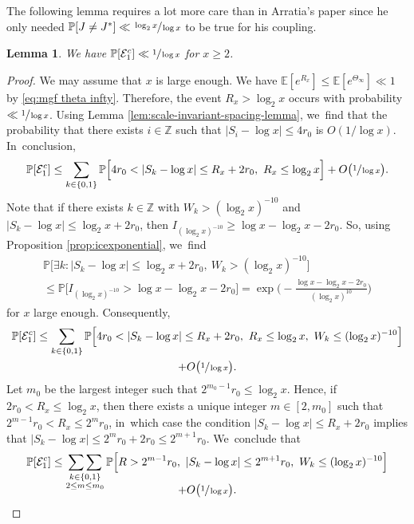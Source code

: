 \documentclass[JEP,XML,SOM,Unicode,published]{cedram}
\newcommand{\ZZ}{\mathbb{Z}}
\newcommand{\PP}{\mathbb{P}}
\newcommand{\EE}{\mathbb{E}}
\newcommand{\EC}{\mathcal{E}}
\newcommand{\bg}{\big}
\newcommand{\bgg}{\Big}
\theoremstyle{plain}
\newtheorem{lem}[cor]{Lemma}
\theoremstyle{definition}
\begin{document}
The following lemma requires a lot more care than in Arratia's paper \cite{Arratia02} since he only needed $\PP[J \ne J^*] \ll \sfrac{\log_2 x}{\log x}$ to be true for his coupling.

\begin{lem}
\label{lem:prob e1c}
We have $\PP[\EC_1^c] \ll \sfrac{1}{\log x}$ for $x\ge2$.
\end{lem}

\begin{proof} We may assume that $x$ is large enough.
We have $\EE[e^{R_x}]\le \EE[e^{\Theta_\infty}] \ll 1$ by \eqref{eq:mgf theta infty}. Therefore, the event $R_x > \log_2 x$ occurs with probability $\ll\sfrac{1}{\log x}$. Using Lemma \ref{lem:scale-invariant-spacing-lemma}, we~find that the probability that there exists $i\in\ZZ$ such that $|S_i-\log x|\le 4r_0$ is $O(1/\log x)$. In~conclusion,
\[
\PP[\EC_1^c] \le \sum_{k\in\{0,1\}} \PP\bgg[4r_0<|S_k-\log x|\le R_x+2r_0,\ R_x\le \log_2x \bgg] +O\bg(\sfrac{1}{\log x}\bg).
\]
\pagebreak[2]
Note that if there exists $k \in \ZZ$ with $W_k>(\log_2x)^{-10}$ and $|S_k-\log x|\le \log_2x + 2r_0$, then $I_{(\log_2x)^{-10}}\ge \log x-\log_2x-2r_0$. So, using Proposition \ref{prop:icexponential}, we~find
\begin{multline*}
\PP\bgg[\exists k: |S_k-\log x|\le \log_2x+2r_0,\ W_k>(\log_2x)^{-10} \bgg] \\
\le \PP\bg[I_{(\log_2 x)^{-10}} > \log x-\log_2x-2r_0\bg]
= \exp\!\bgg(\!-\frac{\log x-\log_2x-2r_0}{(\log_2x)^{10}}\bgg)
\end{multline*}
for $x$ large enough. Consequently,
\begin{multline*}
\PP[\EC_1^c] \le \sum_{k\in\{0,1\}} \PP\bgg[4r_0<|S_k-\log x|\le R_x+2r_0,\ R_x\le \log_2x,\ W_k\le(\log_2x)^{-10} \bgg] \\
+ O\bg(\sfrac{1}{\log x}\bg).
\end{multline*}
Let $m_0$ be the largest integer such that $2^{m_0-1}r_0\le \log_2x$. Hence, if $2r_0<R_x\le\log_2x$, then there exists a unique integer $m\!\in\![2,m_0]$ such that $2^{m-1}r_0\!<\!R_x\!\le\! 2^mr_0$, in~which case the condition $|S_k-\log x|\!\le\! R_x+2r_0$ implies that $|S_k-\log x|\!\le\! 2^mr_0 +2r_0\!\le\! 2^{m+1}r_0$. We~conclude that
\begin{multline*}
\PP[\EC_1^c]
\le \mathop{\sum\sum}_{\substack{k\in\{0,1\} \\ 2\le m\le m_0} }
\PP\bgg[R> 2^{m-1}r_0,\ |S_k-\log x|\le 2^{m+1}r_0,\ W_k \le (\log_2 x)^{-10} \bgg] \\[-10pt]
+O\bg(\sfrac{1}{\log x}\bg).

\end{multline*}
\end{proof}
\end{document}
